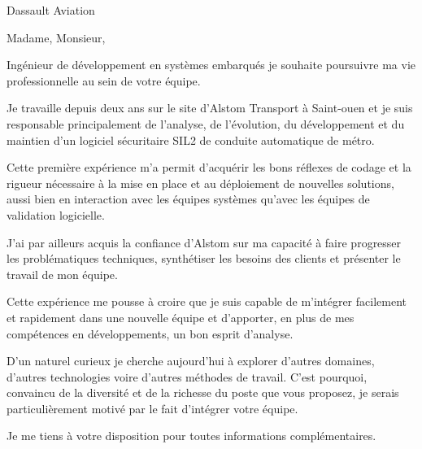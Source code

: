\documentclass[11pt]{lettre}
\makeatletter
\newcommand*{\NoRule}{\renewcommand*{\rule@length}{0}}
\makeatother
\begin{document}
\begin{letter}{Dassault Aviation}

  \signature{Hoel IRIS}
  \address{Hoel IRIS\\
  54 avenue Mathurin Moreau\\
  75019 Paris\\
  Tel : 06 18 39 30 11\\
  E-Mail : hoel.iris@gmail.com}
  \NoRule
  \notelephone
  \nofax
    \opening{Madame, Monsieur,}
    
    Ingénieur de développement en systèmes embarqués je souhaite poursuivre ma vie professionnelle au sein de votre équipe.
    
    Je travaille depuis deux ans sur le site d'Alstom Transport à Saint-ouen et je suis responsable principalement de l'analyse, de l'évolution, du développement et du maintien d'un logiciel sécuritaire SIL2 de conduite automatique de métro.
    
    Cette première expérience m'a permit d'acquérir les bons réflexes de codage et la rigueur nécessaire à la mise en place et au déploiement de nouvelles solutions, aussi bien en interaction avec les équipes systèmes qu'avec les équipes de validation logicielle.
    
    J'ai par ailleurs acquis la confiance d'Alstom sur ma capacité à faire progresser les problématiques techniques, synthétiser les besoins des clients et présenter le travail de mon équipe.
    
    Cette expérience me pousse à croire que je suis capable de m'intégrer facilement et rapidement dans une nouvelle équipe et d'apporter, en plus de mes compétences en développements, un bon esprit d'analyse.
    
    D'un naturel curieux je cherche aujourd'hui à explorer d'autres domaines, d'autres technologies voire d'autres méthodes de travail. C'est pourquoi, convaincu de la diversité et de la richesse du poste que vous proposez, je serais particulièrement motivé par le fait d’intégrer votre équipe.
    
    Je me tiens à votre disposition pour toutes informations complémentaires.
 
 
 
 
 


\end{letter}
\end{document}
